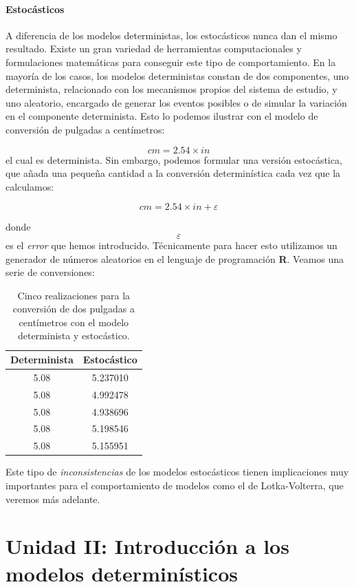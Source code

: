 \documentclass[
]{book}
\begin{document}
\hypertarget{estocuxe1sticos}{%
\subsubsection{Estocásticos}\label{estocuxe1sticos}}

A diferencia de los modelos deterministas, los estocásticos nunca dan el mismo resultado. Existe un gran variedad de herramientas computacionales y formulaciones matemáticas para conseguir este tipo de comportamiento. En la mayoría de los casos, los modelos deterministas constan de dos componentes, uno determinista, relacionado con los mecanismos propios del sistema de estudio, y uno aleatorio, encargado de generar los eventos posibles o de simular la variación en el componente determinista. Esto lo podemos ilustrar con el modelo de conversión de pulgadas a centímetros:

\[
cm = 2.54 \times in
\]
el cual es determinista. Sin embargo, podemos formular una versión estocástica, que añada una pequeña cantidad a la conversión determinística cada vez que la calculamos:

\[
cm = 2.54 \times in + \varepsilon
\]

donde \[\varepsilon\] es el \emph{error} que hemos introducido. Técnicamente para hacer esto utilizamos un generador de números aleatorios en el lenguaje de programación \textbf{R}. Veamos una serie de conversiones:

\begin{table}

\caption{\label{tab:unnamed-chunk-18}Cinco realizaciones para la conversión de dos pulgadas a centímetros con el modelo determinista y estocástico.}
\centering
\begin{tabular}[t]{c|c}
\hline
Determinista & Estocástico\\
\hline
5.08 & 5.237010\\
\hline
5.08 & 4.992478\\
\hline
5.08 & 4.938696\\
\hline
5.08 & 5.198546\\
\hline
5.08 & 5.155951\\
\hline
\end{tabular}
\end{table}

Este tipo de \emph{inconsistencias} de los modelos estocásticos tienen implicaciones muy importantes para el comportamiento de modelos como el de Lotka-Volterra, que veremos más adelante.

\hypertarget{unidad-ii-introducciuxf3n-a-los-modelos-determinuxedsticos}{%
\chapter{Unidad II: Introducción a los modelos determinísticos}\label{unidad-ii-introducciuxf3n-a-los-modelos-determinuxedsticos}}
\end{document}

